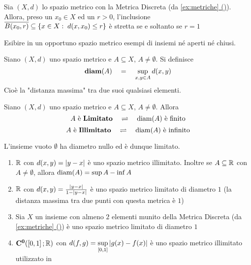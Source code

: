 \begin{proposition}
	Sia $(X,d)$ lo spazio metrico con la Metrica Discreta (da \hyperref[ex:dist_discr]{\cref*{ex:metriche} ()}).\\
	Allora, preso un $x_0 \in X$ ed un $r > 0$, l'inclusione $\overline{B(x_0,r)} \subseteq \left\{x \in X:\; d(x,x_0) \leq r\right\}$ è stretta se e soltanto se $r = 1$
\end{proposition}
\begin{exercise}
	Esibire in un opportuno spazio metrico esempi di insiemi né aperti né chiusi.
\end{exercise}

\begin{definition}
	Siano $(X,d)$ uno spazio metrico e $A\subseteq X$, $A \neq \emptyset$. Si definisce
	$$\boldsymbol{\operatorname{diam}}(A) \quad = \quad \sup\limits_{x,y \in A} d(x,y)$$
	Cioè la "distanza massima" tra due suoi qualsiasi elementi.
\end{definition}
\begin{definition}
	Siano $(X,d)$ uno spazio metrico e $A\subseteq X$, $A \neq \emptyset$. Allora
	$$A \text{ è \textbf{Limitato}} \quad \rightleftharpoons \quad \operatorname{diam}(A) \text{ è finito}$$
	$$A \text{ è \textbf{Illimitato}} \quad \rightleftharpoons \quad \operatorname{diam}(A) \text{ è infinito}$$
\end{definition}
\begin{note}
	L'insieme vuoto $\emptyset$ ha diametro nullo ed è dunque limitato.
\end{note}
\begin{example}\leavevmode\vspace*{-\baselineskip}
	\begin{enumerate}
		\item $\mathbb{R}$ con $d(x,y) = \left|y-x\right|$ è uno spazio metrico illimitato. Inoltre se $A \subseteq \mathbb{R}$ con $A \neq \emptyset$, allora $\operatorname{diam}(A) = \sup A - \inf A$
		\item $\mathbb{R}$ con $d(x,y) = \frac{\left|y-x\right|}{1-\left|y-x\right|}$ è uno spazio metrico limitato di diametro $1$ (la distanza massima tra due punti con questa metrica è $1$)
		\item Sia $X$ un insieme con almeno $2$ elementi munito della Metrica Discreta (da \hyperref[ex:dist_discr]{\cref*{ex:metriche} ()}) è uno spazio metrico limitato di diametro $1$ %
		\item $\mathbf{C^{0}}(\left[0,1\right]; \mathbb{R})$ con $d(f,g) = \sup\limits_{\left[0,1\right]} \left|g(x)-f(x)\right|$ è uno spazio metrico illimitato utilizzato in 
	\end{enumerate}
\end{example}
